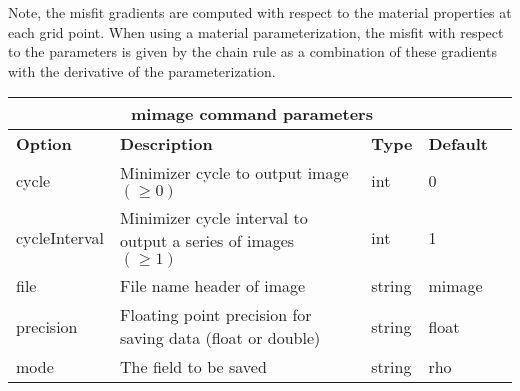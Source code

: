 \documentclass[12pt]{report}
\begin{document}
Note, the misfit gradients are computed with respect to the material properties at each grid point.
When using a material parameterization, the misfit with respect to the parameters is given by the chain
rule as a combination of these gradients with the derivative of the parameterization. \par
\begin{center}
\begin{tabular}{|l|p{8cm}|l|l|l|} \hline
\multicolumn{4}{|c|}{\bf mimage command parameters}\\ \hline
{\bf Option} & {\bf Description}          & {\bf Type} & {\bf Default} \\ \hline 
\hline
cycle         & Minimizer cycle to output image $(\geq 0)$                     & int    & 0 \\ \hline
cycleInterval & Minimizer cycle interval to output a series of images $(\geq 1)$ & int   & 1 \\ \hline
file          & File name header of image                                   & string & mimage \\ \hline
precision     & Floating point precision for saving data (float or double)  & string & float \\ \hline
mode          & The field to be saved                                       & string & rho \\ \hline
\end{tabular}
\end{center}



 
\end{document}

